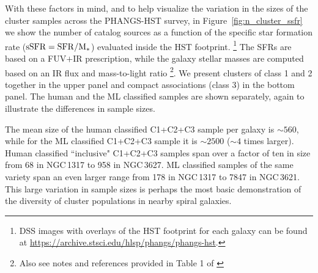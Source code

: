 \documentclass[linenumbers]{aastex63}
\begin{document}
With these factors in mind, and to help visualize the variation in the sizes of the cluster samples across the PHANGS-HST survey, in Figure~\ref{fig:n_cluster_ssfr} we show the number of catalog sources as a function of the specific star formation rate (${\rm sSFR = SFR / M_{*}}$) evaluated inside the HST footprint. \footnote{DSS images with overlays of the HST footprint for each galaxy can be found at \url{https://archive.stsci.edu/hlsp/phangs/phangs-hst}.}  
The SFRs are based on a FUV$+$IR prescription, while the galaxy stellar masses are computed based on an IR flux and mass-to-light ratio \citep{leroy_z_2019,leroy_phangs-alma_2021}\footnote{Also see notes and references provided in Table 1 of \citet{lee_phangs-hst_2022}}.  We present clusters of class 1 and 2 together in the upper panel and compact associations (class 3) in the bottom panel.  
The human and the ML classified samples are shown separately, again to illustrate the differences in sample sizes. 


The mean size of the human classified C1+C2+C3 sample per galaxy is $\sim560$, while for the ML classified C1+C2+C3 sample it is $\sim2500$ ($\sim4$ times larger).  Human classified ``inclusive" C1+C2+C3 samples span over a factor of ten in size from 68 in NGC\,1317 to 958 in NGC\,3627.  ML classified samples of the same variety span an even larger range from  178 in NGC\,1317 to 7847 in NGC\,3621.  This large variation in sample sizes is perhaps the most basic demonstration of the diversity of cluster populations in nearby spiral galaxies.

\end{document}
